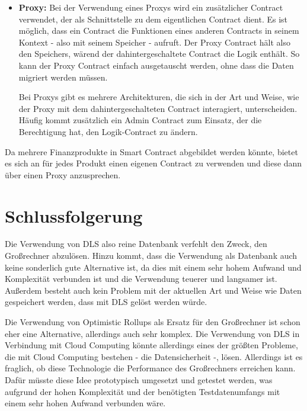 \documentclass[12pt, a4paper]{article}
\newcommand{\footappendix}[2]{
      \footnote{
        #1 \hyperref[#2]{\nameref*{#2}, S. \pageref*{#2}}.
      }
    }
\begin{document}
{\begin{itemize}
    \item \textbf{Proxy:}
    Bei der Verwendung eines Proxys wird ein zusätzlicher Contract verwendet, der als Schnittstelle zu dem eigentlichen Contract dient.
    Es ist möglich, dass ein Contract die Funktionen eines anderen Contracts in seinem Kontext - also mit seinem Speicher - aufruft.
    Der Proxy Contract hält also den Speichers, wärend der dahintergeschaltete Contract die Logik enthält.
    So kann der Proxy Contract einfach ausgetauscht werden, ohne dass die Daten migriert werden müssen.

    \noindent
    Bei Proxys gibt es mehrere Architekturen, die sich in der Art und Weise, wie der Proxy mit dem dahintergeschalteten Contract interagiert, unterscheiden.
    Häufig kommt zusätzlich ein Admin Contract zum Einsatz, der die Berechtigung hat, den Logik-Contract zu ändern.
\end{itemize}

\noindent
Da mehrere Finanzprodukte in Smart Contract abgebildet werden könnte, bietet es sich an für jedes Produkt einen eigenen Contract zu verwenden und diese dann über einen Proxy anzusprechen.
\noindent

\section{Schlussfolgerung}
\label{sec:Fazit}

Die Verwendung von DLS also reine Datenbank verfehlt den Zweck, den Großrechner abzulösen. 
Hinzu kommt, dass die Verwendung als Datenbank auch keine sonderlich gute Alternative ist, da dies mit einem sehr hohem Aufwand und Komplexität verbunden ist und die Verwendung teuerer und langsamer ist.
Außerdem besteht auch kein Problem mit der aktuellen Art und Weise wie Daten gespeichert werden, dass mit DLS gelöst werden würde.

\noindent
Die Verwendung von Optimistic Rollups als Ersatz für den Großrechner ist schon eher eine Alternative, allerdings auch sehr komplex.
Die Verwendung von DLS in Verbindung mit Cloud Computing könnte allerdings eines der größten Probleme, die mit Cloud Computing bestehen - die Datensicherheit -, lösen.
Allerdings ist es fraglich, ob diese Technologie die Performance des Großrechners erreichen kann.
Dafür müsste diese Idee prototypisch umgesetzt und getestet werden, was aufgrund der hohen Komplexität und der benötigten Testdatenumfangs mit einem sehr hohen Aufwand verbunden wäre.

}
\end{document}
